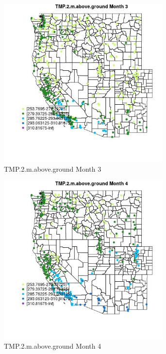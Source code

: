 \begin{figure} 
\centering  
\includegraphics[width=0.77\textwidth]{Code_Outputs/Report_ML_input_PM25_Step4_part_e_de_duplicated_aves_compiled_2019-05-18wNAs_MapObsMo3TMP2maboveground.jpg} 
\caption{\label{fig:Report_ML_input_PM25_Step4_part_e_de_duplicated_aves_compiled_2019-05-18wNAsMapObsMo3TMP2maboveground}TMP.2.m.above.ground Month 3} 
\end{figure} 
 

\begin{figure} 
\centering  
\includegraphics[width=0.77\textwidth]{Code_Outputs/Report_ML_input_PM25_Step4_part_e_de_duplicated_aves_compiled_2019-05-18wNAs_MapObsMo4TMP2maboveground.jpg} 
\caption{\label{fig:Report_ML_input_PM25_Step4_part_e_de_duplicated_aves_compiled_2019-05-18wNAsMapObsMo4TMP2maboveground}TMP.2.m.above.ground Month 4} 
\end{figure} 
 

